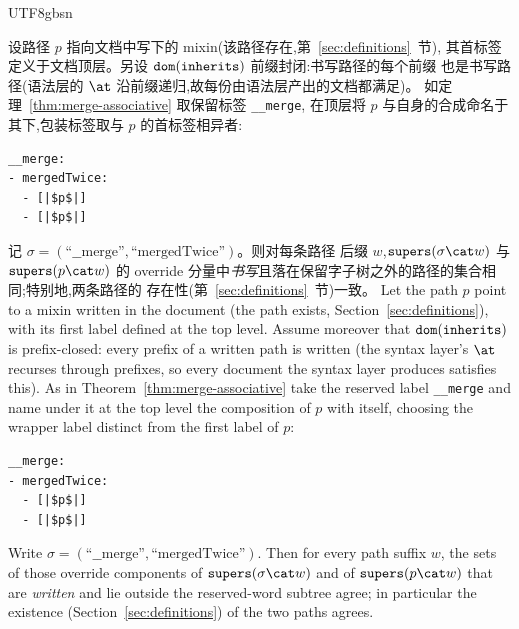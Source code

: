 \begin{CJK*}{UTF8}{gbsn}
\begin{theorem}
  \label{thm:merge-idempotent}
  \ifPaperChinese
  设路径 $p$ 指向文档中写下的 mixin(该路径存在,第~\ref{sec:definitions}~节),
  其首标签定义于文档顶层。另设 $\mathtt{dom}(\mathtt{inherits})$ 前缀封闭:书写路径的每个前缀
  也是书写路径(语法层的 $\at$ 沿前缀递归,故每份由语法层产出的文档都满足)。
  如定理~\ref{thm:merge-associative} 取保留标签 \texttt{__merge},
  在顶层将 $p$ 与自身的合成命名于其下,包装标签取与 $p$ 的首标签相异者:
  \begin{verbatim}
__merge:
- mergedTwice:
  - [|$p$|]
  - [|$p$|]
  \end{verbatim}
  记 $\sigma = (\text{``\_\_merge''}, \text{``mergedTwice''})$。则对每条路径
  后缀 $w$,$\supers(\sigma \cat w)$ 与 $\supers(p \cat w)$ 的 override
  分量中\emph{书写}且落在保留字子树之外的路径的集合相同;特别地,两条路径的
  存在性(第~\ref{sec:definitions}~节)一致。
  \else
  Let the path $p$ point to a mixin written in the document (the
  path exists, Section~\ref{sec:definitions}), with its first label
  defined at the top level. Assume moreover that $\mathtt{dom}(\mathtt{inherits})$
  is prefix-closed: every prefix of a written path is written (the
  syntax layer's $\at$ recurses through prefixes, so every document
  the syntax layer produces satisfies this). As in
  Theorem~\ref{thm:merge-associative} take the reserved label
  \texttt{__merge} and name under it at the top level the
  composition of $p$ with itself, choosing the wrapper label distinct
  from the first label of $p$:
  \begin{verbatim}
__merge:
- mergedTwice:
  - [|$p$|]
  - [|$p$|]
  \end{verbatim}
  Write $\sigma = (\text{``\_\_merge''}, \text{``mergedTwice''})$. Then
  for every path suffix $w$, the sets of those override components
  of $\supers(\sigma \cat w)$ and of $\supers(p \cat w)$ that are
  \emph{written} and lie outside the reserved-word subtree agree; in
  particular the existence (Section~\ref{sec:definitions}) of the
  two paths agrees.
  \fi
\end{theorem}


\end{CJK*}
